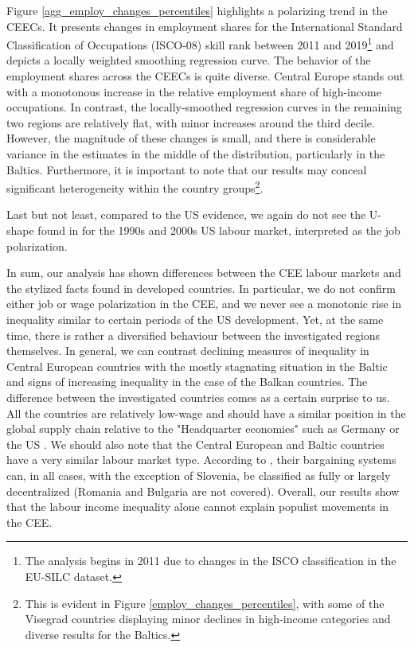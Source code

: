 \documentclass[11pt]{article}
\begin{document}
Figure \ref{agg_employ_changes_percentiles} highlights a polarizing trend in the CEECs. It presents changes in employment shares for the International Standard Classification of Occupations (ISCO-08) skill rank between 2011 and 2019\footnote{The analysis begins in 2011 due to changes in the ISCO classification in the EU-SILC dataset.} and depicts a locally weighted smoothing regression curve. The behavior of the employment shares across the CEECs is quite diverse. Central Europe stands out with a monotonous increase in the relative employment share of high-income occupations. In contrast, the locally-smoothed regression curves in the remaining two regions are relatively flat, with minor increases around the third decile. However, the magnitude of these changes is small, and there is considerable variance in the estimates in the middle of the distribution, particularly in the Baltics. Furthermore, it is important to note that our results may conceal significant heterogeneity within the country groups\footnote{This is evident in Figure \ref{employ_changes_percentiles}, with some of the Visegrad countries displaying minor declines in high-income categories and diverse results for the Baltics.}.

Last but not least, compared to the US evidence, we again do not see the  U-shape found in \citet{acemoglu2012does} for the 1990s and 2000s US labour market, interpreted as the job polarization.



In sum, our analysis has shown differences between the CEE labour markets and the stylized facts found in developed countries. In particular, we do not confirm either job or wage polarization in the CEE, and we never see a monotonic rise in inequality similar to certain periods of the US development. Yet, at the same time, there is rather a diversified behaviour between the investigated regions themselves. In general, we can contrast declining measures of inequality in Central European countries with the mostly stagnating situation in the Baltic and signs of increasing inequality in the case of the Balkan countries.
The difference between the investigated countries comes as a certain surprise to us. All the countries are relatively low-wage and should have a similar position in the global supply chain relative to the "Headquarter economies" such as Germany or the US \citep{baldwin2015supply}. We should also note that the Central European and Baltic countries have a very similar labour market type. According to \citet{/content/publication/1fd2da34-en}, their bargaining systems can, in all cases, with the exception of Slovenia, be classified as fully or largely decentralized (Romania and Bulgaria are not covered). Overall, our results show that the labour income inequality alone cannot explain populist movements in the CEE.
\end{document}
